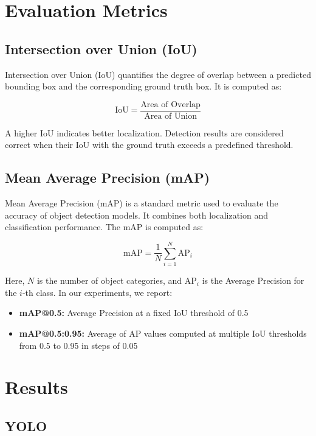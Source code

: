 \documentclass[12pt,a4paper]{article}
\begin{document}
\vspace{-0.9}
\section{\textbf{Evaluation Metrics}}

\subsection{Intersection over Union (IoU)}
Intersection over Union (IoU) quantifies the degree of overlap between a predicted bounding box and the corresponding ground truth box. It is computed as:

\begin{equation}
\text{IoU} = \frac{\text{Area of Overlap}}{\text{Area of Union}}
\end{equation}

A higher IoU indicates better localization. Detection results are considered correct when their IoU with the ground truth exceeds a predefined threshold.

\subsection{Mean Average Precision (mAP)}
Mean Average Precision (mAP) is a standard metric used to evaluate the accuracy of object detection models. It combines both localization and classification performance. The mAP is computed as:

\begin{equation}
\text{mAP} = \frac{1}{N} \sum_{i=1}^{N} \text{AP}_i
\end{equation}

Here, \( N \) is the number of object categories, and \( \text{AP}_i \) is the Average Precision for the \( i \)-th class. In our experiments, we report:
\begin{itemize}
    \item \textbf{mAP@0.5:} Average Precision at a fixed IoU threshold of 0.5
    \item \textbf{mAP@0.5:0.95:} Average of AP values computed at multiple IoU thresholds from 0.5 to 0.95 in steps of 0.05
\end{itemize}


\section{Results}

\subsection{YOLO}
\end{document}
